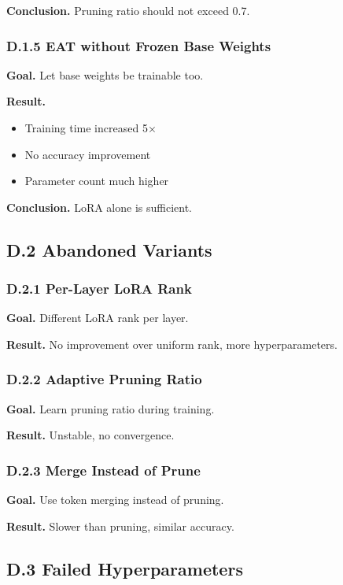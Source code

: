 \textbf{Conclusion.} Pruning ratio should not exceed 0.7.

\subsubsection{D.1.5 EAT without Frozen Base Weights}

\textbf{Goal.} Let base weights be trainable too.

\textbf{Result.} 
\begin{itemize}
\item Training time increased 5$\times$
\item No accuracy improvement
\item Parameter count much higher

\end{itemize}
\textbf{Conclusion.} LoRA alone is sufficient.

\subsection{D.2 Abandoned Variants}

\subsubsection{D.2.1 Per-Layer LoRA Rank}

\textbf{Goal.} Different LoRA rank per layer.

\textbf{Result.} No improvement over uniform rank, more hyperparameters.

\subsubsection{D.2.2 Adaptive Pruning Ratio}

\textbf{Goal.} Learn pruning ratio during training.

\textbf{Result.} Unstable, no convergence.

\subsubsection{D.2.3 Merge Instead of Prune}

\textbf{Goal.} Use token merging instead of pruning.

\textbf{Result.} Slower than pruning, similar accuracy.

\subsection{D.3 Failed Hyperparameters}

